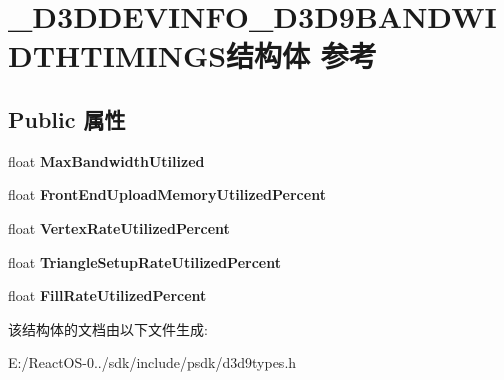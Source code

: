 \hypertarget{struct___d3_d_d_e_v_i_n_f_o___d3_d9_b_a_n_d_w_i_d_t_h_t_i_m_i_n_g_s}{}\section{\+\_\+\+D3\+D\+D\+E\+V\+I\+N\+F\+O\+\_\+\+D3\+D9\+B\+A\+N\+D\+W\+I\+D\+T\+H\+T\+I\+M\+I\+N\+G\+S结构体 参考}
\label{struct___d3_d_d_e_v_i_n_f_o___d3_d9_b_a_n_d_w_i_d_t_h_t_i_m_i_n_g_s}
\subsection*{Public 属性}
\begin{DoxyCompactItemize}
\item 
\mbox{\label{struct___d3_d_d_e_v_i_n_f_o___d3_d9_b_a_n_d_w_i_d_t_h_t_i_m_i_n_g_s_a96e86fa28f77291984c05a02041b1e6b}} 
float {\bfseries Max\+Bandwidth\+Utilized}
\item 
\mbox{\label{struct___d3_d_d_e_v_i_n_f_o___d3_d9_b_a_n_d_w_i_d_t_h_t_i_m_i_n_g_s_a2dfbe569d660e6415bc1427f1eaed6b7}} 
float {\bfseries Front\+End\+Upload\+Memory\+Utilized\+Percent}
\item 
\mbox{\label{struct___d3_d_d_e_v_i_n_f_o___d3_d9_b_a_n_d_w_i_d_t_h_t_i_m_i_n_g_s_a9aa7b0f7c429d846c405b4042d56f66c}} 
float {\bfseries Vertex\+Rate\+Utilized\+Percent}
\item 
\mbox{\label{struct___d3_d_d_e_v_i_n_f_o___d3_d9_b_a_n_d_w_i_d_t_h_t_i_m_i_n_g_s_a99970c33c9d0cab98d02e653219cbb5f}} 
float {\bfseries Triangle\+Setup\+Rate\+Utilized\+Percent}
\item 
\mbox{\label{struct___d3_d_d_e_v_i_n_f_o___d3_d9_b_a_n_d_w_i_d_t_h_t_i_m_i_n_g_s_abb00820da031aff83a07340912d4f38f}} 
float {\bfseries Fill\+Rate\+Utilized\+Percent}
\end{DoxyCompactItemize}


该结构体的文档由以下文件生成\+:\begin{DoxyCompactItemize}
\item 
E\+:/\+React\+O\+S-\/0../sdk/include/psdk/d3d9types.\+h\end{DoxyCompactItemize}
